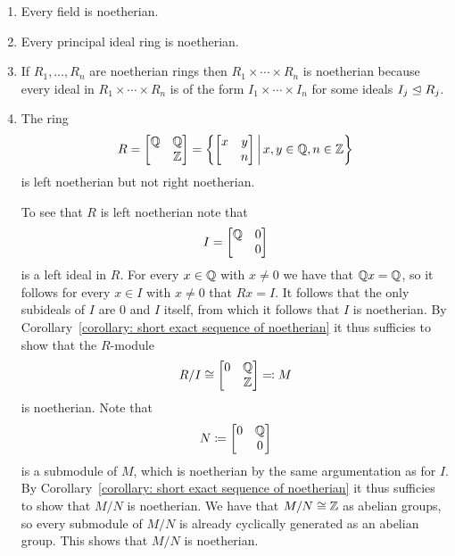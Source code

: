 \begin{example}
  \leavevmode
  \begin{enumerate}
    \item
      Every field is noetherian.
    \item
      Every principal ideal ring is noetherian.
    \item
      If $R_1, \dotsc, R_n$ are noetherian rings then $R_1 \times \dotsb \times R_n$ is noetherian because every ideal in $R_1 \times \dotsb \times R_n$ is of the form $I_1 \times \dotsb \times I_n$ for some ideals $I_j \trianglelefteq R_j$.
    \item
      The ring
      \[
          R
        = \begin{bmatrix}
            \Rational & \Rational \\
                      & \Integer
          \end{bmatrix}
        = \left\{
            \begin{bmatrix}
              x & y \\
                & n 
            \end{bmatrix}
          \suchthat*
            x, y \in \Rational,
            n \in \Integer
          \right\}
      \]
      is left noetherian but not right noetherian.
      
      To see that $R$ is left noetherian note that
      \[
          I
        = \begin{bmatrix}
            \mathbb{Q} & 0 \\
                      & 0
          \end{bmatrix}
      \]
      is a left ideal in $R$.
      For every $x \in \mathbb{Q}$ with $x \neq 0$ we have that $\mathbb{Q} x = \mathbb{Q}$, so it follows for every $x \in I$ with $x \neq 0$ that $Rx = I$.
      It follows that the only subideals of $I$ are $0$ and $I$ itself, from which it follows that $I$ is noetherian.
      By Corollary~\ref{corollary: short exact sequence of noetherian} it thus sufficies to show that the $R$-module
      \[
                R/I
        \cong   \begin{bmatrix}
                  0 & \mathbb{Q} \\
                    & \mathbb{Z}
                \end{bmatrix}
        \eqqcolon M
      \]
      is noetherian.
      Note that
      \[
                  N
        \coloneqq  \begin{bmatrix}
                    0 & \mathbb{Q} \\
                      & 0
                  \end{bmatrix}
      \]
      is a submodule of $M$, which is noetherian by the same argumentation as for $I$.
      By Corollary~\ref{corollary: short exact sequence of noetherian} it thus sufficies to show that $M/N$ is noetherian.
      We have that $M/N \cong \mathbb{Z}$ as abelian groups, so every submodule of $M/N$ is already cyclically generated as an abelian group.
      This shows that $M/N$ is noetherian.
      

\end{enumerate}
\end{example}
